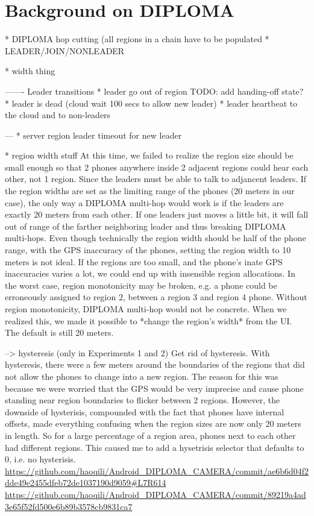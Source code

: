 \chapter{Background on DIPLOMA}

* DIPLOMA hop cutting (all regions in a chain have to be populated
* LEADER/JOIN/NONLEADER

* width thing

-------
Leader transitions
* leader go out of region TODO: add handing-off state?
* leader is dead (cloud wait 100 secs to allow new leader)
* leader heartbeat to the cloud and to non-leaders

---
* server region leader timeout for new leader

* region width stuff
At this time, we failed to realize the region size should be small enough so that 2 phones anywhere inside 2 adjacent regions could hear each other, not 1 region. Since the leaders must be able to talk to adjancent leaders. If the region widths are set as the limiting range of the phones (20 meters in our case), the only way a DIPLOMA multi-hop would work is if the leaders are exactly 20 meters from each other. If one leaders just moves a little bit, it will fall out of range of the farther neighboring leader and thus breaking DIPLOMA multi-hops.
    Even though technically the region width should be half of the phone range, with the GPS inaccuracy of the phones, setting the region width to 10 meters is not ideal. If the regions are too small, and the phone's inate GPS inaccuracies varies a lot, we could end up with insensible region allocations. In the worst case, region monotonicity may be broken, e.g. a phone could be erroneously assigned to region 2, between a region 3 and region 4 phone. Without region monotonicity, DIPLOMA multi-hop would not be concrete.
    When we realized this, we made it possible to *change the region's width* from the UI. The default is still 20 meters.

--> hysteresis (only in Experiments 1 and 2)
Get rid of hysteresis. With hysteresis, there were a few meters around the boundaries of the regions that did not allow the phones to change into a new region. The reason for this was because we were worried that the GPS would be very imprecise and cause phone standing near region boundaries to flicker between 2 regions.  
    However, the downside of hysterisis, compounded with the fact that phones have internal offsets, made everything confusing when the region sizes are now only 20 meters in length. So for a large percentage of a region area, phones next to each other had different regions.
    This caused me to add a hysetrisis selector that defaults to 0, i.e. no hysterisis.
        {\url{https://github.com/haoqili/Android_DIPLOMA_CAMERA/commit/ae6b6d04f2dde49e2455dfeb72de1037190d9059#L7R614}}
        {\url{https://github.com/haoqili/Android_DIPLOMA_CAMERA/commit/89219a4ad3e65f52fd500e6b89b3578cb9831ca7}}


